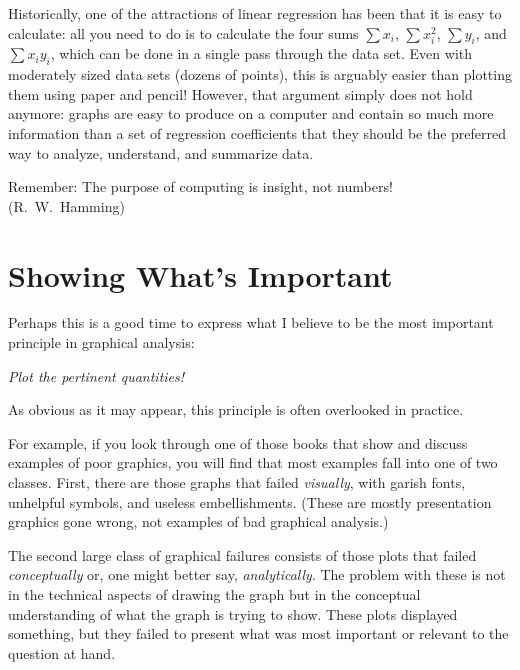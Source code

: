 Historically, one of the attractions of linear regression has been
that it is easy to calculate: all you need to do is to calculate the
four sums $\sum x_i$, $\sum x_i^2$, $\sum y_i$, and $\sum x_i y_i$,
which can be done in a single pass through the data set. Even with
moderately sized data sets (dozens of points), this is arguably easier
than plotting them using paper and pencil! However, that argument
simply does not hold anymore: graphs are easy to produce on a computer
and contain so much more information than a set of regression
coefficients that they should be the preferred way to analyze,
understand, and summarize data.

Remember: The purpose of computing is insight, not numbers! (R.\ W.\
Hamming)

\vspace*{-9pt}
\section{Showing What's Important}


Perhaps this is a good time to express what I believe to be the most
important principle in graphical analysis:

\emph{Plot the pertinent quantities!}

As obvious as it may appear, this principle is often overlooked in
practice.

For example, if you look through one of those books that show and
discuss examples of poor graphics, you will find that most examples
fall into one of two classes. First, there are those graphs that
failed \emph{visually}, with garish fonts, unhelpful symbols, and
useless embellishments. (These are mostly presentation graphics gone
wrong, not examples of bad graphical analysis.)

The second large class of graphical failures consists of those plots
that failed \emph{conceptually} or, one might better say,
\emph{analytically}. The problem\vadjust{\pagebreak} with these is not in the technical
aspects of drawing the graph but in the conceptual understanding of
what the graph is trying to show. These plots displayed something, but
they failed to present what was most important or relevant to the
question at hand.

